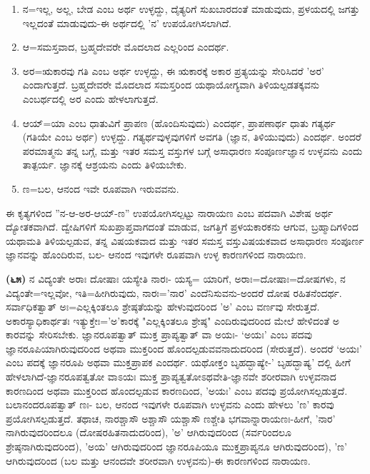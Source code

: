 \begin{enumerate}[label=(\roman*)]
\item ನ=ಇಲ್ಲ, ಅಲ್ಲ, ಬೇಡ ಎಂಬ ಅರ್ಥ ಉಳ್ಳದ್ದು, ದೈತ್ಯರಿಗೆ ಸುಖಬಾರದಂತೆ ಮಾಡುವುದು, ಪ್ರಳಯದಲ್ಲಿ ಜಗತ್ತು ಇಲ್ಲದಂತೆ ಮಾಡುವುದು-ಈ ಅರ್ಥದಲ್ಲಿ 'ನ' ಉಪಯೋಗಿಸಲಾಗಿದೆ.

 \item ಆ=ಸಮಸ್ತವಾದ, ಬ್ರಹ್ಮದೇವರೇ ಮೊದಲಾದ ಎಲ್ಲರಿಂದ ಎಂದರ್ಥ.

 \item ಅರ=ಋಕಾರವು ಗತಿ ಎಂಬ ಅರ್ಥ ಉಳ್ಳದ್ದು, ಈ ಋಕಾರಕ್ಕೆ ಅಕಾರ ಪ್ರತ್ಯಯನ್ನು ಸೇರಿಸಿದರೆ 'ಅರ' ಎಂದಾಗುತ್ತದೆ. ಬ್ರಹ್ಮದೇವರೇ ಮೊದಲಾದ ಸಮಸ್ತರಿಂದ ಯಥಾಯೋಗ್ಯವಾಗಿ ತಿಳಿಯಲ್ಪಡತಕ್ಕವನು ಎಂಬರ್ಥದಲ್ಲಿ ಅರ ಎಂದು ಹೇಳಲಾಗುತ್ತದೆ.

 \item ಆಯ್=ಯಾ ಎಂಬ ಧಾತುವಿಗೆ ಪ್ರಾಪಣ (ಹೊಂದಿಸುವುದು) ಎಂದರ್ಥ, ಪ್ರಾಪಣಾರ್ಥ ಧಾತು ಗತ್ಯರ್ಥ (ಗತಿಯೇ ಎಂಬ ಅರ್ಥ) ಉಳ್ಳದ್ದು. ಗತ್ಯರ್ಥವುಳ್ಳವುಗಳಿಗೆ ಅವಗತಿ (ಜ್ಞಾನ, ತಿಳಿಯುವುದು) ಎಂದರ್ಥ. ಅಂದರೆ ಪರಮಾತ್ಮನು ತನ್ನ ಬಗ್ಗೆ, ಮತ್ತು ಇತರ ಸಮಸ್ತ ವಸ್ತುಗಳ ಬಗ್ಗೆ ಅಸಾಧಾರಣ ಸಂಪೂರ್ಣಜ್ಞಾನ ಉಳ್ಳವನು ಎಂದು ತಾತ್ಪರ್ಯ. ಜ್ಞಾನಕ್ಕೆ ಆಶ್ರಯನು ಎಂದು ತಿಳಿಯಬೇಕು.

 \item ಣ=ಬಲ, ಆನಂದ ಇವೇ ರೂಪವಾಗಿ ಇರುವವನು.

\end{enumerate}

ಈ ಕೃತ್ಯಗಳಿಂದ ''ನ-ಆ-ಅರ-ಆಯ್-ಣ'' ಉಪಯೋಗಿಸಲ್ಪಟ್ಟು ನಾರಾಯಣ ಎಂಬ ಪದವಾಗಿ ವಿಶೇಷ ಅರ್ಥ ದ್ಯೋತಕವಾಗಿದೆ. ದ್ವೇಷಿಗಳಿಗೆ ಸುಖಪ್ರಾಪ್ತವಾಗದಂತೆ ಮಾಡುವ, ಜಗತ್ತಿಗೆ ಪ್ರಳಯಕಾರಕನು ಆಗುವ, ಬ್ರಹ್ಮಾದಿಗಳಿಂದ ಯಥಾಮತಿ ತಿಳಿಯಲ್ಪಡುವ, ತನ್ನ ವಿಷಯಕವಾದ ಮತ್ತು ಇತರ ಸಮಸ್ತ ವಸ್ತುವಿಷಯಕವಾದ ಅಸಾಧಾರಣ ಸಂಪೂರ್ಣ ಜ್ಞಾನವನ್ನು ಹೊಂದಿರುವ, ಬಲ- ಆನಂದ ಇವುಗಳೇ ರೂಪವಾಗಿ ಉಳ್ಳ ಕಾರಣಗಳಿಂದ ನಾರಾಯಣ.

\textbf{(೬೫)} ನ ವಿದ್ಯಂತೇ ಅರಾಃ ದೋಷಾಃ ಯಸ್ಯೇತಿ ನಾರಃ- ಯಸ್ಯ= ಯಾರಿಗೆ, ಅರಾಃ=ದೋಷಾಃ=ದೋಷಗಳು, ನ ವಿದ್ಯಂತೇ=ಇಲ್ಲವೋ, ಇತಿ=ಹೀಗಿರುವುದು, ನಾರಃ=\-'ನಾರ' ಎಂದೆನಿಸುವನು-ಅಂದರೆ ದೋಷ ರಹಿತನೆಂದರ್ಥ. ಸರ್ವಾಧಿಕತ್ವಾತ್ ಅಃ=\break ಎಲ್ಲಕ್ಕಿಂತಲೂ ಶ್ರೇಷ್ಠತೆಯನ್ನು ಹೇಳುವುದರಿಂದ 'ಅ' ಎಂಬ ವರ್ಣವು ಸೇರುತ್ತದೆ. ಅಕಾರಸ್ಯಾಧಿಕಾರ್ಥತಃ ಇತ್ಯುಕ್ತೇಃ='ಅ'ಕಾರಕ್ಕೆ "ಎಲ್ಲಕ್ಕಿಂತಲೂ ಶ್ರೇಷ್ಠ" ಎಂದಿರುವುದರಿಂದ ಮೇಲೆ ಹೇಳಿದಂತೆ ಅ ಕಾರವನ್ನು ಸೇರಿಸಬೇಕು. ಜ್ಞಾನರೂಪತ್ವಾತ್ ಮುಕ್ತ ಪ್ರಾಪ್ಯತ್ವಾತ್ ವಾ ಅಯಃ- `ಅಯಃ' ಎಂಬ ಪದವು ಜ್ಞಾನರೂಪಿಯಾಗಿರುವುದರಿಂದ ಅಥವಾ ಮುಕ್ತರಿಂದ ಹೊಂದಲ್ಪಡುವವನಾದುದರಿಂದ (ಸೇರುತ್ತದೆ). ಅಂದರೆ `ಅಯಃ' ಎಂಬ ಪದಕ್ಕೆ ಜ್ಞಾನರೂಪಿ ಅಥವಾ ಮುಕ್ತಪ್ರಾಪಕ ಎಂದರ್ಥ. ಯಥೋಕ್ತಂ ಬೃಹದ್ಭಾಷ್ಯೇ-' ಬೃಹದ್ಭಾಷ್ಯ' ದಲ್ಲಿ ಹೀಗೆ ಹೇಳ\-ಲಾಗಿದೆ-ಜ್ಞಾನರೂಪತ್ವತೋ ವಾಽಯಃ ಮುಕ್ತ ಪ್ರಾಪ್ಯತ್ವತೋಽಥವೇತಿ-ಜ್ಞಾನವೇ ಶರೀರವಾಗಿ ಉಳ್ಳವನಾದ ಕಾರಣದಿಂದ ಅಥವಾ ಮುಕ್ತರಿಂದ ಹೊಂದಲ್ಪಡುವ ಕಾರಣದಿಂದ, 'ಅಯಃ' ಎಂಬ ಪದವು ಪ್ರಯೋಗಿಸಲ್ಪಡುತ್ತದೆ. ಬಲಾನಂದರೂಪತ್ವಾತ್ ಣಃ- ಬಲ, ಆನಂದ ಇವುಗಳೇ ರೂಪವಾಗಿ ಉಳ್ಳವನು ಎಂದು ಹೇಳಲು 'ಣ' ಕಾರವು ಪ್ರಯೋಗಿಸಲ್ಪಡುತ್ತದೆ. ತಥಾಚ, ನಾರಶ್ಚಾಸೌ ಅಶ್ಚಾಸೌ ಯಶ್ಚಾಸೌ ಣಶ್ಚೇತಿ ಭಗವಾನ್ನಾರಾಯಣಃ-ಹೀಗೆ, 'ನಾರ' ನಾಗಿರುವುದರಿಂದಲೂ (ದೋಷರಹಿತನಾದುದರಿಂದ), 'ಅ' ಆಗಿರುವುದರಿಂದ (ಸರ್ವರಿಂದಲೂ ಶ್ರೇಷ್ಠನಾಗಿರುವುದರಿಂದ), 'ಅಯ' ಆಗಿರುವುದರಿಂದ ಜ್ಞಾನರೂಪಿಯೂ ಮುಕ್ತಪ್ರಾಪ್ಯನೂ ಆಗಿರುವುದರಿಂದ), 'ಣ' ಆಗಿರುವುದರಿಂದ (ಬಲ ಮತ್ತು ಆನಂದವೇ ಶರೀರವಾಗಿ ಉಳ್ಳವನು)-ಈ ಕಾರಣಗಳಿಂದ ನಾರಾಯಣ.

